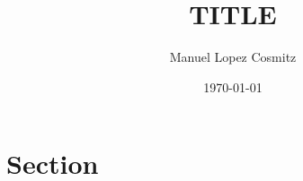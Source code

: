 \documentclass{article}
\title{\vspace{-1.5cm} TITLE}
\author{Manuel Lopez Cosmitz}
\date{\today}
\begin{document}
\maketitle
\section{Section}
\end{document}
